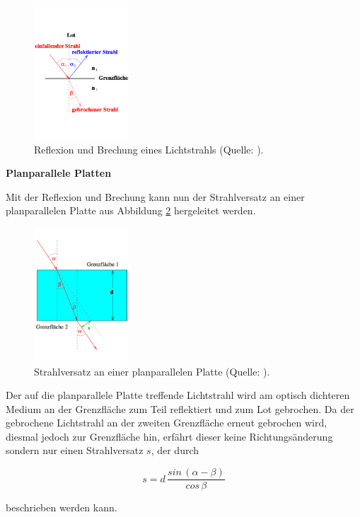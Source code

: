 \begin{figure}
    \centering
       \includegraphics[height=5cm]{rt.pdf}
       \caption{Reflexion und Brechung eines Lichtstrahls (Quelle: \cite{V400}).}
       \label{fig:rt}
\end{figure}

\noindent
\textbf{Planparallele Platten}

\noindent
Mit der Reflexion und Brechung kann nun der Strahlversatz an einer planparallelen Platte aus Abbildung \ref{fig:plan} hergeleitet werden.

\begin{figure}
    \centering
       \includegraphics[height=5cm]{plan.pdf}
       \caption{Strahlversatz an einer planparallelen Platte (Quelle: \cite{V400}).}
       \label{fig:plan}
\end{figure}

\noindent
Der auf die planparallele Platte treffende Lichtstrahl wird am optisch dichteren Medium an der Grenzfläche zum Teil reflektiert und zum Lot gebrochen.
Da der gebrochene Lichtstrahl an der zweiten Grenzfläche erneut gebrochen wird, diesmal jedoch zur Grenzfläche hin,
erfährt dieser keine Richtungsänderung sondern nur einen Strahlversatz $s$, der durch 

\begin{equation}
s = d \, \frac{sin\, (\alpha-\beta)}{cos\,\beta}
\label{eqn:s}
\end{equation}

\noindent
beschrieben werden kann.

